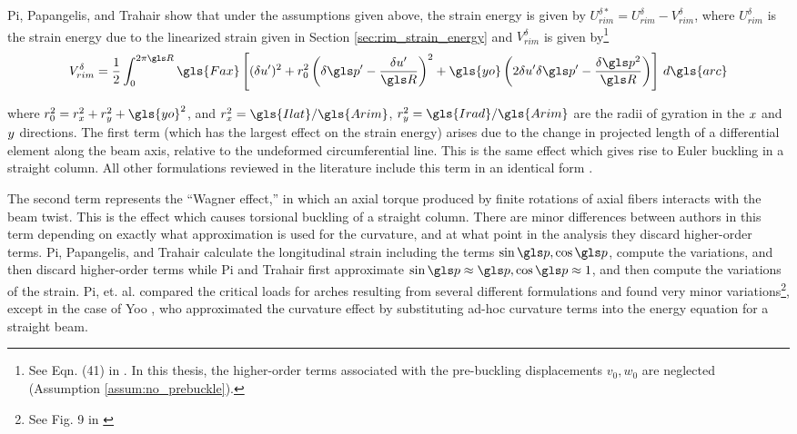 \documentclass[\rootdir/thesis.tex]{subfiles}
\begin{document}
Pi, Papangelis, and Trahair \cite{Pi1995} show that under the assumptions given above, the strain energy is given by $U_{rim}^{\delta*} = U_{rim}^{\delta} - V_{rim}^{\delta}$, where $U_{rim}^{\delta}$ is the strain energy due to the linearized strain given in Section \ref{sec:rim_strain_energy} and $V_{rim}^{\delta}$ is given by\footnote{See Eqn. (41) in \cite{Pi1995}. In this thesis, the higher-order terms associated with the pre-buckling displacements $v_0,w_0$ are neglected (Assumption \ref{assum:no_prebuckle}).}
\begin{equation}
\label{eq:V_rim}
V_{rim}^{\delta} = \frac{1}{2}\int_0^{2\pi \R} \gls{Fax} \left [
	(\delta u')^2 +
	\ro^2 \left(\delta\p' - \frac{\delta u'}{\R}\right)^2 +
	\gls{yo} \left(2\delta u'\delta\p' - \frac{\delta\p^2}{\R}\right)
\right] \, d\gls{arc}
\end{equation}

where $\ro^2 = \rx^2 + \ry^2 + \gls{yo}^2$, and $\rx^2 = \gls{Ilat}/\gls{Arim}$, $\ry^2 = \gls{Irad}/\gls{Arim}$ are the radii of gyration in the $x$ and $y$ directions. The first term (which has the largest effect on the strain energy) arises due to the change in projected length of a differential element along the beam axis, relative to the undeformed circumferential line. This is the same effect which gives rise to Euler buckling in a straight column. All other formulations reviewed in the literature include this term in an identical form \cite{Pi1995,Lim2004,Ryu2012,Trahair1987,Guo2014,Pi2002}.

The second term represents the ``Wagner effect,'' in which an axial torque produced by finite rotations of axial fibers interacts with the beam twist. This is the effect which causes torsional buckling of a straight column. There are minor differences between authors in this term depending on exactly what approximation is used for the curvature, and at what point in the analysis they discard higher-order terms. Pi, Papangelis, and Trahair \cite{Pi1995} calculate the longitudinal strain including the terms $\sin{\p},\cos{\p}$, compute the variations, and then discard higher-order terms while Pi and Trahair \cite{Pi1992} first approximate $\sin{\p}\approx \p, \cos{\p} \approx 1$, and then compute the variations of the strain. Pi, et. al. \cite{Pi2005} compared the critical loads for arches resulting from several different formulations and found very minor variations\footnote{See Fig. 9 in \cite{Pi2005}}, except in the case of Yoo \cite{Yoo1982}, who approximated the curvature effect by substituting ad-hoc curvature terms into the energy equation for a straight beam.
\end{document}
